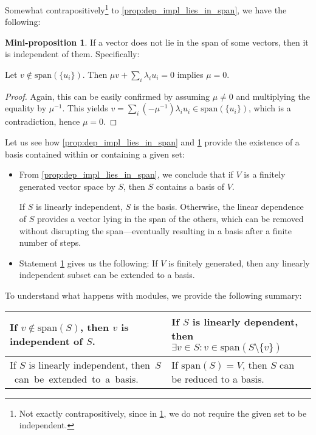 \documentclass{article}
\newif\ifusemulticols
\theoremstyle{definition}
\newtheorem{miniprop}{Mini-proposition}[section]
\theoremstyle{remark}
\theoremstyle{plain}
\theoremstyle{plain}
\newenvironment{mymulticols}
    { \ifusemulticols \begin{multicols}{2} \fi }
    { \ifusemulticols \end{multicols} \fi }
\begin{document}
\begin{mymulticols}
Somewhat contrapositively\footnote{Not exactly contrapositively, since in
\ref{prop:not_in_span_inpl_indep}, we do not require the given set to be independent.} to
\ref{prop:dep_impl_lies_in_span}, we have the following:

\begin{miniprop}
    \label{prop:not_in_span_inpl_indep}
    If a vector does not lie in the span of some vectors, then it is independent of them. Specifically:

    Let $v \not\in \text{span}(\{u_i\})$. Then $\mu v + \sum_i \lambda_i u_i = 0$ implies $\mu = 0$.
\end{miniprop}
\begin{proof}
    Again, this can be easily confirmed by assuming $\mu \neq 0$ and multiplying the equality by $\mu^{-1}$.
    This yields $v = \sum_i \left(-\mu^{-1}\right)\lambda_i u_i \in \text{span}(\{u_i\})$, which is 
    a contradiction, hence $\mu = 0$.
\end{proof}

Let us see how \ref{prop:dep_impl_lies_in_span} and \ref{prop:not_in_span_inpl_indep} provide the
existence of a basis contained within or containing a given set:

\begin{itemize}
    \item From \ref{prop:dep_impl_lies_in_span}, we conclude that if $V$ is a finitely generated
        vector space by $S$, then $S$ contains a basis of $V$.

        If $S$ is linearly independent, $S$ is the basis. Otherwise, the linear dependence of $S$
        provides a vector lying in the span of the others, which can be removed without disrupting
        the span—eventually resulting in a basis after a finite number of steps.

    \item Statement \ref{prop:not_in_span_inpl_indep} gives us the following: If $V$ is finitely
        generated, then any linearly independent subset can be extended to a basis.
\end{itemize}

To understand what happens with modules, we provide the following summary:

\begin{table}[h]
    \begin{tabular}{L|L}
        If $v \notin \text{span}(S)$, then $v$ is independent of $S$. &
        If $S$ is linearly dependent, then ${\exists v \in S}: {v \in \text{span}(S \setminus \{v\})}$ \\
        \hline
        If $S$ is linearly independent, \mbox{then $S$ can be extended to a basis.} &
        If $\text{span}(S) = V$, then $S$ can be reduced to a basis.
    \end{tabular}%
\end{table}


\end{mymulticols}
\end{document}
